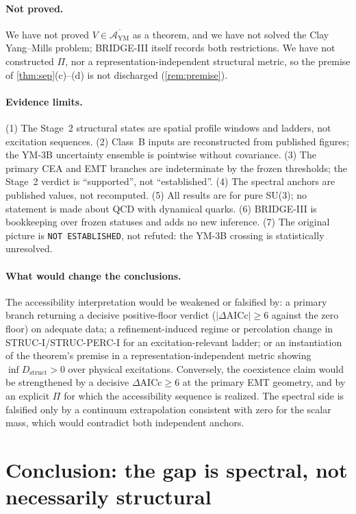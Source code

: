 \documentclass[11pt,a4paper]{article}
\theoremstyle{definition}
\theoremstyle{remark}
\newcommand{\Dstruct}{D_{\mathrm{struct}}}
\newcommand{\AYM}{\mathcal{A}_{\mathrm{YM}}}
\begin{document}
\paragraph{Not proved.} We have not proved $V\in\overline{\AYM}$ as a theorem, and we have not solved the Clay Yang--Mills problem; BRIDGE-III itself records both restrictions. We have not constructed $\Pi$, nor a representation-independent structural metric, so the premise of \cref{thm:sep}(c)--(d) is not discharged (\cref{rem:premise}).

\paragraph{Evidence limits.} (1) The Stage~2 structural states are spatial profile windows and ladders, not excitation sequences. (2) Class~B inputs are reconstructed from published figures; the YM-3B uncertainty ensemble is pointwise without covariance. (3) The primary CEA and EMT branches are indeterminate by the frozen thresholds; the Stage~2 verdict is ``supported'', not ``established''. (4) The spectral anchors are published values, not recomputed. (5) All results are for pure SU(3); no statement is made about QCD with dynamical quarks. (6) BRIDGE-III is bookkeeping over frozen statuses and adds no new inference. (7) The original picture is \texttt{NOT ESTABLISHED}, not refuted: the YM-3B crossing is statistically unresolved.

\paragraph{What would change the conclusions.} The accessibility interpretation would be weakened or falsified by: a primary branch returning a decisive positive-floor verdict ($|\Delta\mathrm{AICc}|\ge6$ against the zero floor) on adequate data; a refinement-induced regime or percolation change in STRUC-I/STRUC-PERC-I for an excitation-relevant ladder; or an instantiation of the theorem's premise in a representation-independent metric showing $\inf\Dstruct>0$ over physical excitations. Conversely, the coexistence claim would be strengthened by a decisive $\Delta\mathrm{AICc}\ge6$ at the primary EMT geometry, and by an explicit $\Pi$ for which the accessibility sequence is realized. The spectral side is falsified only by a continuum extrapolation consistent with zero for the scalar mass, which would contradict both independent anchors.

\section{Conclusion: the gap is spectral, not necessarily structural}\label{sec:conclusion}
\end{document}
